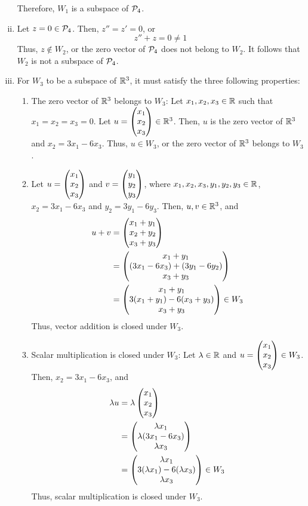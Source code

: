 \begin{sol}
\begin{enumerate}[(i)]
\begin{enumerate}[(1)]
        \end{enumerate}
        Therefore, $W_1$ is a subspace of $\P_4$.
        \item Let $z=0\in\P_4$. Then, $z''=z'=0$, or
        \[
            z''+z=0\not=1
        \]
        Thus, $z\not\in W_2$, or the zero vector of $\P_4$ does not belong to $W_2$. It follows that $W_2$ is not a subspace of $\P_4$.
        \item For $W_3$ to be a subspace of $\R^{3}$, it must satisfy the three following properties:
        \begin{enumerate}[(1)]
            \item The zero vector of $\R^{3}$ belongs to $W_3$: Let $x_1,x_2,x_3\in\R$ such that $x_1=x_2=x_3=0$. Let $u=\colvecthree{x_1}{x_2}{x_3}\in\R^{3}$. Then, $u$ is the zero vector of $\R^{3}$ and $x_2=3x_1-6x_3$. Thus, $u\in W_3$, or the zero vector of $\R^{3}$ belongs to $W_3$.
            \item Let $u=\colvecthree{x_1}{x_2}{x_3}$ and $v=\colvecthree{y_1}{y_2}{y_3}$, where $x_1,x_2,x_3,y_1,y_2,y_3\in\R$, $x_2=3x_1-6x_3$ and $y_2=3y_1-6y_3$. Then, $u,v\in\R^{3}$, and
            \[
                \begin{aligned}
                    u+v & = \colvecthree{x_1+y_1}{x_2+y_2}{x_3+y_3}                      \\
                        & = \colvecthree{x_1+y_1}{(3x_1-6x_3)+(3y_1-6y_2)}{x_3+y_3}       \\
                        & = \colvecthree{x_1+y_1}{3(x_1+y_1)-6(x_3+y_3)}{x_3+y_3}\in W_3
                \end{aligned}
            \]
            Thus, vector addition is closed under $W_3$.
            \item Scalar multiplication is closed under $W_3$: Let $\lam\in\R$ and $u=\colvecthree{x_1}{x_2}{x_3}\in W_3$. Then, $x_2=3x_1-6x_3$, and
            \[
                \begin{aligned}
                    \lam u & = \lam\colvecthree{x_1}{x_2}{x_3}                                  \\
                            & = \colvecthree{\lam x_1}{\lam (3x_1-6x_3)}{\lam x_3}               \\
                            & = \colvecthree{\lam x_1}{3(\lam x_1)-6(\lam x_3)}{\lam x_3}\in W_3
                \end{aligned}
            \]
            Thus, scalar multiplication is closed under $W_3$.
        \end{enumerate}

\end{enumerate}
\end{sol}

